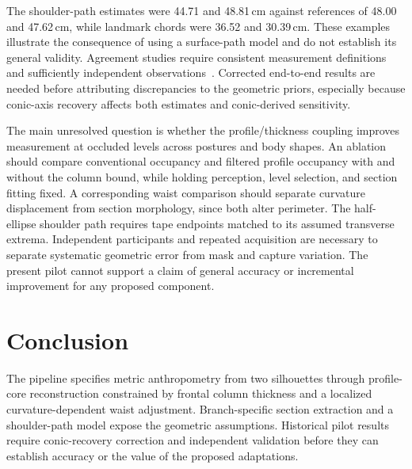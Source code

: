 \documentclass[11pt,a4paper]{article}
\begin{document}
The shoulder-path estimates were 44.71 and 48.81\,cm against references of 48.00 and 47.62\,cm, while landmark chords were 36.52 and 30.39\,cm. These examples illustrate the consequence of using a surface-path model and do not establish its general validity. Agreement studies require consistent measurement definitions and sufficiently independent observations~\cite{bland1986}. Corrected end-to-end results are needed before attributing discrepancies to the geometric priors, especially because conic-axis recovery affects both estimates and conic-derived sensitivity.

The main unresolved question is whether the profile/thickness coupling improves measurement at occluded levels across postures and body shapes. An ablation should compare conventional occupancy and filtered profile occupancy with and without the column bound, while holding perception, level selection, and section fitting fixed. A corresponding waist comparison should separate curvature displacement from section morphology, since both alter perimeter. The half-ellipse shoulder path requires tape endpoints matched to its assumed transverse extrema. Independent participants and repeated acquisition are necessary to separate systematic geometric error from mask and capture variation. The present pilot cannot support a claim of general accuracy or incremental improvement for any proposed component.

\section{Conclusion}
The pipeline specifies metric anthropometry from two silhouettes through profile-core reconstruction constrained by frontal column thickness and a localized curvature-dependent waist adjustment. Branch-specific section extraction and a shoulder-path model expose the geometric assumptions. Historical pilot results require conic-recovery correction and independent validation before they can establish accuracy or the value of the proposed adaptations.
\end{document}
